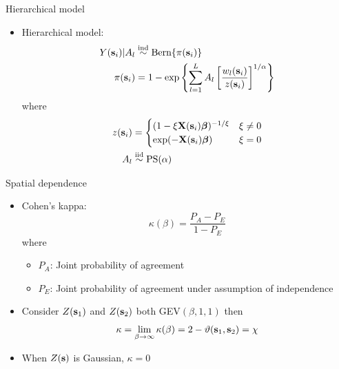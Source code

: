 \documentclass{beamer}
\begin{document}
\begin{frame}{Hierarchical model}
	\begin{itemize} \setlength{\itemsep}{1em}
		\item Hierarchical model:
		\begin{align*}
		Y(\mathbf{s}_i) | A_l &\stackrel{\mathrm{ind}}{\sim} \text{Bern}\{\pi(\mathbf{s}_i)\}\\
		\pi(\mathbf{s}_i) &= 1 - \exp\left\{ \sum_{l = 1}^L A_l \left[\frac{ w_l (\mathbf{s}_i) }{z(\mathbf{s}_i)} \right]^{1 / \alpha} \right\}\\
		\end{align*} \vspace{-0.5em}
		where
		\begin{align*}
		z(\mathbf{s}_i) &= \begin{cases}
		(1 - \xi \mathbf{X}(\mathbf{s}_i) \mbox{\boldmath $\beta$})^{-1 / \xi} & \xi \neq 0 \\
		\exp(-\mathbf{X}(\mathbf{s}_i) \mbox{\boldmath $\beta$}) & \xi = 0
		\end{cases}\\
		A_l &\stackrel{\mathrm{iid}}{\sim} \text{PS}(\alpha)
		\end{align*}
	\end{itemize}
\end{frame}

\begin{frame}{Spatial dependence}
	\begin{itemize} \setlength{\itemsep}{1em}
		\item Cohen's kappa: $$\kappa(\beta) = \frac{P_A - P_E}{1 - P_E}$$
		where
		\begin{itemize} \setlength{\itemsep}{0.5em}
			\item $P_A$: Joint probability of agreement
			\item $P_E$: Joint probability of agreement under assumption of independence
		\end{itemize}
		\item Consider $Z(\mathbf{s}_1)$ and $Z(\mathbf{s}_2)$ both GEV$(\beta, 1, 1)$ then $$\kappa = \lim_{\beta \rightarrow \infty} \kappa(\beta) = 2 - \vartheta(\mathbf{s}_1, \mathbf{s}_2) = \chi$$
		\item When $Z(\mathbf{s})$ is Gaussian, $\kappa = 0$
	\end{itemize}
\end{frame}
\end{document}
